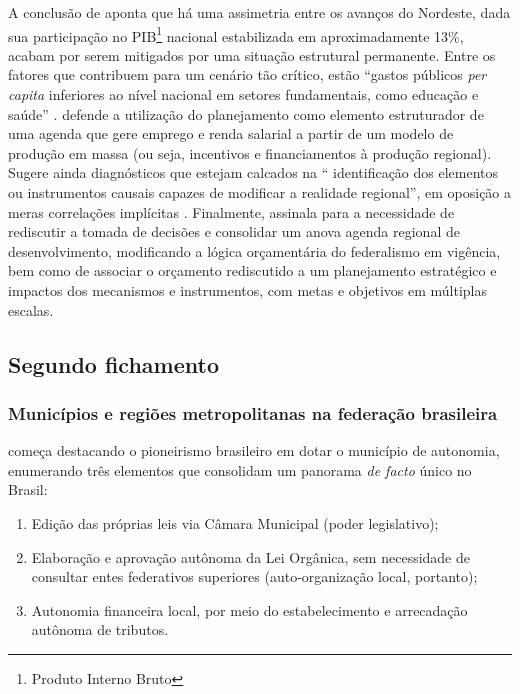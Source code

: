 \documentclass[
article,			%
11pt,				%
oneside,			%
a4paper,			%
english,			%
brazil,				%
sumario=tradicional
]{abntex2}
\begin{document}
	A conclusão de  aponta que há uma assimetria entre os avanços do Nordeste, dada sua participação no PIB\footnote{Produto Interno Bruto} nacional estabilizada em aproximadamente 13\%, acabam por serem mitigados por uma situação estrutural permanente. Entre os fatores que contribuem para um cenário tão crítico, estão ``gastos públicos \textit{per capita} inferiores ao nível nacional em setores fundamentais, como educação e saúde'' \cite[p. 107]{mendes2012}.  defende a utilização do planejamento como elemento estruturador de uma agenda que gere emprego e renda salarial a partir de um modelo de produção em massa (ou seja, incentivos e financiamentos à produção regional). Sugere ainda diagnósticos que estejam calcados na `` identificação dos elementos ou instrumentos causais capazes de modificar a realidade regional'', em oposição a meras correlações implícitas \cite[p. 108]{mendes2012}. Finalmente,  assinala para a necessidade de rediscutir a tomada de decisões e consolidar um anova agenda regional de desenvolvimento, modificando a lógica orçamentária do federalismo em vigência, bem como de associar o orçamento rediscutido a um planejamento estratégico e impactos dos mecanismos e instrumentos, com metas e objetivos em múltiplas escalas.
	
	\subsection{Segundo fichamento}
	
	\subsubsection{Municípios e regiões metropolitanas na federação brasileira}
	
	 começa destacando o pioneirismo brasileiro em dotar o município de autonomia, enumerando três elementos que consolidam um panorama \textit{de facto} único no Brasil:
	
	\begin{enumerate}
		\item Edição das próprias leis via Câmara Municipal (poder legislativo);
		\item Elaboração e aprovação autônoma da Lei Orgânica, sem necessidade de consultar entes federativos superiores (auto-organização local, portanto);
		\item Autonomia financeira local, por meio do estabelecimento e arrecadação autônoma de tributos.
	\end{enumerate}
	
\end{document}
